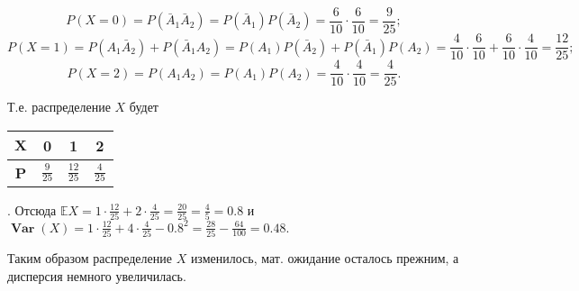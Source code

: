 \documentclass{article}
\DeclareMathOperator{\Var}{\textbf{Var}}
\begin{document}
$$P(X=0)=P(\bar A_1 \bar A_2)=P(\bar A_1)P(\bar A_2)=\frac{6}{10}\cdot\frac{6}{10}=\frac{9}{25};$$
$$P(X=1)=P(A_1\bar A_2)+P(\bar A_1 A_2)=P(A_1)P(\bar A_2)+P(\bar A_1)P(A_2)=\frac{4}{10}\cdot\frac{6}{10}+\frac{6}{10}\cdot\frac{4}{10}=\frac{12}{25};$$
$$P(X=2)=P(A_1A_2)=P(A_1)P(A_2)=\frac{4}{10}\cdot\frac{4}{10}=\frac{4}{25}.$$
\par
Т.е. распределение $X$ будет \begin{tabular}{|c|c|c|c|}\hline$\textbf{X}$ & 0 & 1 & 2\\\hline\textbf{P} & $\frac{9}{25}$ & $\frac{12}{25}$ & $\frac{4}{25}$\\\hline\end{tabular}. Отсюда $\mathbb{E}X=1\cdot\frac{12}{25}+2\cdot\frac{4}{25}=\frac{20}{25}=\frac{4}{5}=0.8$ и $\Var(X)=1\cdot\frac{12}{25}+4\cdot\frac{4}{25}-0.8^2=\frac{28}{25}-\frac{64}{100}=0.48.$
\par
Таким образом распределение $X$ изменилось, мат. ожидание осталось прежним, а дисперсия немного увеличилась.
 
\end{document}

